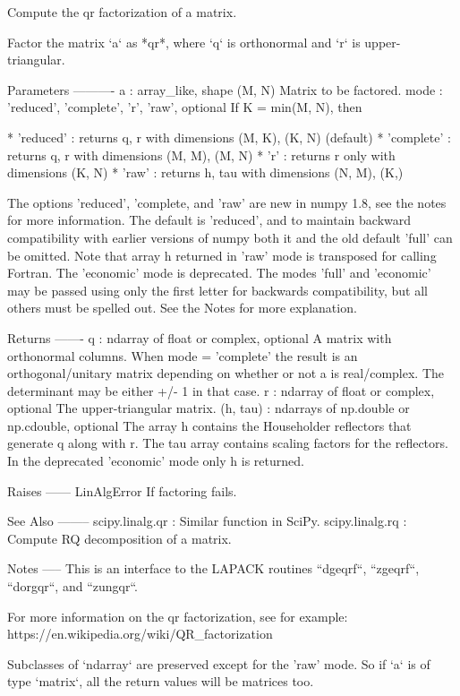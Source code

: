 \begin{DoxyVerb}Compute the qr factorization of a matrix.

Factor the matrix `a` as *qr*, where `q` is orthonormal and `r` is
upper-triangular.

Parameters
----------
a : array_like, shape (M, N)
    Matrix to be factored.
mode : {'reduced', 'complete', 'r', 'raw'}, optional
    If K = min(M, N), then

    * 'reduced'  : returns q, r with dimensions (M, K), (K, N) (default)
    * 'complete' : returns q, r with dimensions (M, M), (M, N)
    * 'r'        : returns r only with dimensions (K, N)
    * 'raw'      : returns h, tau with dimensions (N, M), (K,)

    The options 'reduced', 'complete, and 'raw' are new in numpy 1.8,
    see the notes for more information. The default is 'reduced', and to
    maintain backward compatibility with earlier versions of numpy both
    it and the old default 'full' can be omitted. Note that array h
    returned in 'raw' mode is transposed for calling Fortran. The
    'economic' mode is deprecated.  The modes 'full' and 'economic' may
    be passed using only the first letter for backwards compatibility,
    but all others must be spelled out. See the Notes for more
    explanation.


Returns
-------
q : ndarray of float or complex, optional
    A matrix with orthonormal columns. When mode = 'complete' the
    result is an orthogonal/unitary matrix depending on whether or not
    a is real/complex. The determinant may be either +/- 1 in that
    case.
r : ndarray of float or complex, optional
    The upper-triangular matrix.
(h, tau) : ndarrays of np.double or np.cdouble, optional
    The array h contains the Householder reflectors that generate q
    along with r. The tau array contains scaling factors for the
    reflectors. In the deprecated  'economic' mode only h is returned.

Raises
------
LinAlgError
    If factoring fails.

See Also
--------
scipy.linalg.qr : Similar function in SciPy.
scipy.linalg.rq : Compute RQ decomposition of a matrix.

Notes
-----
This is an interface to the LAPACK routines ``dgeqrf``, ``zgeqrf``,
``dorgqr``, and ``zungqr``.

For more information on the qr factorization, see for example:
https://en.wikipedia.org/wiki/QR_factorization

Subclasses of `ndarray` are preserved except for the 'raw' mode. So if
`a` is of type `matrix`, all the return values will be matrices too.


\end{DoxyVerb}

